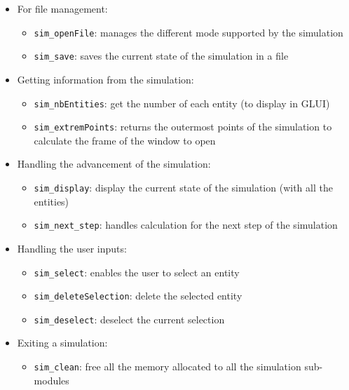 \documentclass[a4paper]{article} %
\begin{document}
\begin{multicols*}{2}
\begin{itemize}
\item For file management:
    \begin{itemize}
    \item \texttt{sim\_openFile}: manages the different mode supported by the simulation
    \item \texttt{sim\_save}: saves the current state of the simulation in a file
    \end{itemize}
\item Getting information from the simulation:
    \begin{itemize}
    \item \texttt{sim\_nbEntities}: get the number of each entity (to display in GLUI)
    \item \texttt{sim\_extremPoints}: returns the outermost points of the simulation to calculate the frame of the window to open
    \end{itemize}
\item Handling the advancement of the simulation:
    \begin{itemize}
    \item \texttt{sim\_display}: display the current state of the simulation (with all the entities) 
    \item \texttt{sim\_next\_step}: handles calculation for the next step of the simulation
    \end{itemize}
\item Handling the user inputs:
    \begin{itemize}
    \item \texttt{sim\_select}: enables the user to select an entity
    \item \texttt{sim\_deleteSelection}: delete the selected entity
    \item \texttt{sim\_deselect}: deselect the current selection
    \end{itemize}
\item Exiting a simulation:
    \begin{itemize}
    \item \texttt{sim\_clean}: free all the memory allocated to all the simulation sub-modules
    \end{itemize}
\end{itemize}



\label{lastpage}
\end{multicols*}
\end{document}
